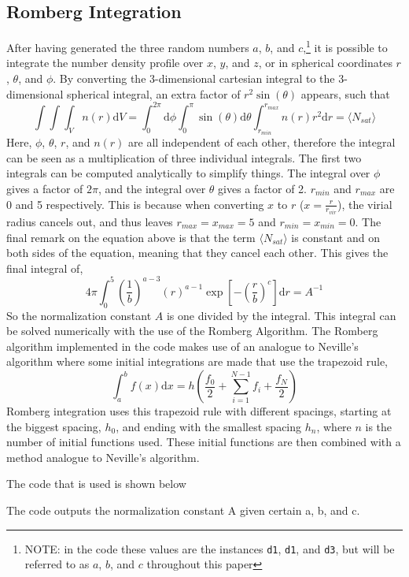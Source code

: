\subsection{Romberg Integration}
After having generated the three random numbers $a$, $b$, and $c$,\footnote{NOTE: in the code these values are the instances \texttt{d1}, \texttt{d1}, and \texttt{d3}, but will be referred to as $a$, $b$, and $c$ throughout this paper} it is possible to integrate the number density profile over $x$, $y$, and $z$, or in spherical coordinates $r$, $\theta$, and $\phi$. By converting the 3-dimensional cartesian integral to the 3-dimensional spherical integral, an extra factor of $r^2 \sin(\theta)$ appears, such that
\begin{equation}
\int\int\int_V n(r) \mathrm{d}V = 
\int_0^{2\pi} \mathrm{d}\phi \int_0^{\pi} \sin(\theta)\mathrm{d}\theta \int_{r_{min}}^{r_{max}} n(r)r^2 \mathrm{d}r = \langle N_{sat} \rangle
\end{equation}
Here, $\phi$, $\theta$, $r$, and $n(r)$ are all independent of each other, therefore the integral can be seen as a multiplication of three individual integrals. The first two integrals can be computed analytically to simplify things. The integral over $\phi$ gives a factor of $2\pi$, and the integral over $\theta$ gives a factor of 2. $r_{min}$ and $r_{max}$ are 0 and 5 respectively. This is because when converting $x$ to $r$ ($x = \frac{r}{r_{vir}}$), the virial radius cancels out, and thus leaves $r_{max} = x_{max} = 5$ and $r_{min} = x_{min} = 0$. The final remark on the equation above is that the term $\langle N_{sat} \rangle$ is constant and on both sides of the equation, meaning that they cancel each other. This gives the final integral of,
\begin{equation}
4\pi \int_{0}^{5} \left(\frac{1}{b}\right)^{a-3} (r)^{a-1} \exp\left[-\left(\frac{r}{b}\right)^c\right] \mathrm{d}r = A^{-1}
\end{equation}
So the normalization constant $A$ is one divided by the integral. This integral can be solved numerically with the use of the Romberg Algorithm. The Romberg algorithm implemented in the code makes use of an analogue to Neville's algorithm where some initial integrations are made that use the trapezoid rule,
\begin{equation*}
\int_a^b f(x) \mathrm{d}x = h\left(\frac{f_0}{2}+\sum_{i=1}^{N-1}f_i + \frac{f_N}{2}\right)
\end{equation*}
Romberg integration uses this trapezoid rule with different spacings, starting at the biggest spacing, $h_0$, and ending with the smallest spacing $h_n$, where $n$ is the number of initial functions used. These initial functions are then combined with a method analogue to Neville's algorithm.

The code that is used is shown below


The code outputs the normalization constant A given certain a, b, and c.



